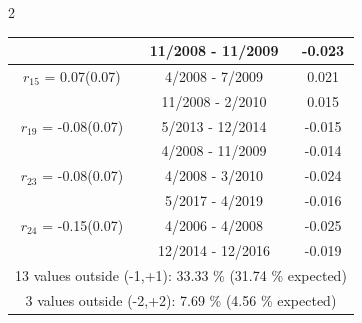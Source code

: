 \begin{multicols}{2}
{\begin{tabular}{ccc}
  &       11/2008 - 11/2009 &       -0.023  \vspace{-.02in}   \\ \hline 
    $r_{15}$ = 0.07(0.07) &       4/2008 -  7/2009 &        0.021   \vspace{-.10in} \\  
&       11/2008 -  2/2010 &        0.015  \vspace{-.02in} \\ \hline 
  $r_{19}$ = -0.08(0.07) &       5/2013 - 12/2014 &       -0.015    \vspace{-.10in} \\ 
  &        4/2008 - 11/2009 &       -0.014  \vspace{-.02in}   \\ \hline 
    $r_{23}$ = -0.08(0.07) &       4/2008 -  3/2010 &       -0.024    \vspace{-.10in} \\ 
  &        5/2017 -  4/2019 &       -0.016  \vspace{-.02in}   \\ \hline 
    $r_{24}$ = -0.15(0.07) &       4/2006 -  4/2008 &       -0.025    \vspace{-.10in} \\ 
  &       12/2014 - 12/2016 &       -0.019  \vspace{-.02in}   \\ \hline 
  \multicolumn{3}{c}{              13 values outside (-1,+1): 33.33  \% (31.74  \% expected)}\vspace{-.10in} \\ 
\multicolumn{3}{c}{               3 values outside (-2,+2):  7.69 \%  (4.56 \% expected) } \\
 \end{tabular} \\ 
 } 
\end{multicols} 
